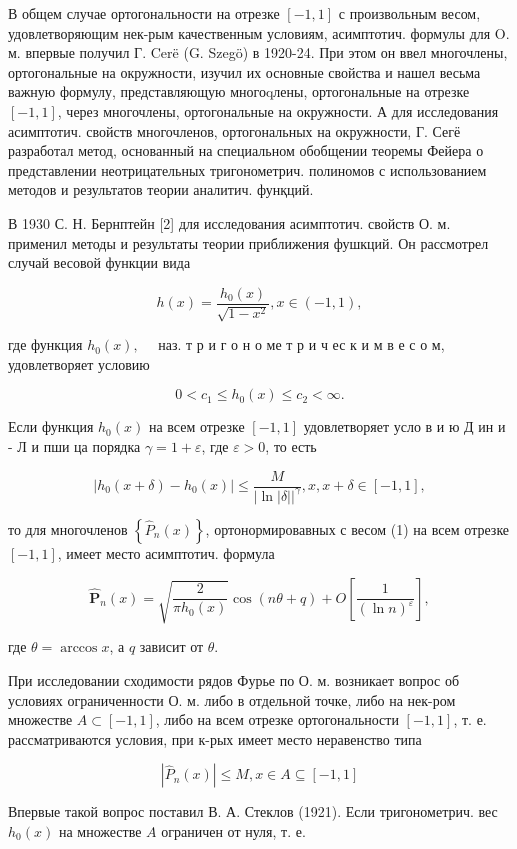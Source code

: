 \documentclass[10pt]{article}
\begin{document}
В общем случае ортогональности на отрезке $[-1,1]$ с произвольным весом, удовлетворяющим нек-рым качественным условиям, асимптотич. формулы для O. м. впервые получил Г. Cerë (G. Szegö) в 1920-24. При этом он ввел многочлены, ортогональные на окружности, изучил их основные свойства и нашел весьма важную формулу, представляющую многоqлены, ортогональные на отрезке $[-1,1]$, через многочлены, ортогональные на окружности. А для исследования асимптотич. свойств многочленов, ортогональных на окружности, Г. Сегё разработал метод, основанный на специальном обобщении теоремы Фейера о представлении неотрицательных тригонометрич. полиномов с использованием методов и результатов теории аналитич. фунқций.

В 1930 С. Н. Бернптейн [2] для исследования асимптотич. свойств О. м. применил методы и результаты теории приближения фушкций. Он рассмотрел случай весовой функции вида

\[
h(x)=\frac{h_{0}(x)}{\sqrt{1-x^{2}}}, x \in(-1,1),
\]

где функция $h_{0}(x), \quad$ наз. т р и г о н о ме т р и ч ес к и м в е с о м, удовлетворяет условию

\[
0<c_{1} \leqslant h_{0}(x) \leqslant c_{2}<\infty .
\]

Если функция $h_{0}(x)$ на всем отрезке $[-1,1]$ удовлетворяет усло в и ю Д ин и - Л и пши ца порядка $\gamma=1+\varepsilon$, где $\varepsilon>0$, то есть

\[
\left|h_{0}(x+\delta)-h_{0}(x)\right| \leqslant \frac{M}{|\ln | \delta||^{\gamma}}, x, x+\delta \in[-1,1],
\]

то для многочленов $\left\{\hat{P}_{n}(x)\right\}$, ортонормировавных с весом (1) на всем отрезке $[-1,1]$, имеет место асимптотич. формула

\[
\hat{\boldsymbol{P}}_{n}(x)=\sqrt{\frac{2}{\pi h_{0}(x)}} \cos (n \theta+q)+O\left[\frac{1}{(\ln n)^{\varepsilon}}\right],
\]

где $\theta=\arccos x$, а $q$ зависит от $\theta$.

При исследовании сходимости рядов Фурье по О. м. возникает вопрос об условиях ограниченности О. м. либо в отдельной точке, либо на нек-ром множестве $A \subset[-1,1]$, либо на всем отрезке ортогональности $[-1,1]$, т. е. рассматриваются условия, при к-рых имеет место неравенство типа

\[
\left|\hat{P}_{n}(x)\right| \leqslant M, x \in A \subseteq[-1,1]
\]

Впервые такой вопрос поставил В. А. Стеклов (1921). Если тригонометрич. вес $h_{0}(x)$ на множестве $A$ ограничен от нуля, т. е.
\end{document}
